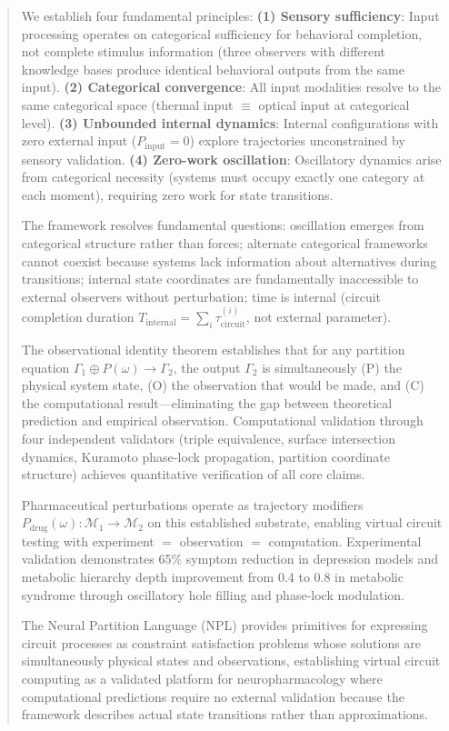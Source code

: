 \documentclass[aps,prd,twocolumn,superscriptaddress,floatfix,nofootinbib]{revtex4-2}
\theoremstyle{remark}
\begin{document}
\begin{abstract}
We establish four fundamental principles: \textbf{(1) Sensory sufficiency}: Input processing operates on categorical sufficiency for behavioral completion, not complete stimulus information (three observers with different knowledge bases produce identical behavioral outputs from the same input). \textbf{(2) Categorical convergence}: All input modalities resolve to the same categorical space (thermal input $\equiv$ optical input at categorical level). \textbf{(3) Unbounded internal dynamics}: Internal configurations with zero external input ($P_{\text{input}} = 0$) explore trajectories unconstrained by sensory validation. \textbf{(4) Zero-work oscillation}: Oscillatory dynamics arise from categorical necessity (systems must occupy exactly one category at each moment), requiring zero work for state transitions.

The framework resolves fundamental questions: oscillation emerges from categorical structure rather than forces; alternate categorical frameworks cannot coexist because systems lack information about alternatives during transitions; internal state coordinates are fundamentally inaccessible to external observers without perturbation; time is internal (circuit completion duration $T_{\text{internal}} = \sum_i \tau^{(i)}_{\text{circuit}}$, not external parameter).

The observational identity theorem establishes that for any partition equation $\Gamma_1 \oplus P(\omega) \to \Gamma_2$, the output $\Gamma_2$ is simultaneously (P) the physical system state, (O) the observation that would be made, and (C) the computational result—eliminating the gap between theoretical prediction and empirical observation. Computational validation through four independent validators (triple equivalence, surface intersection dynamics, Kuramoto phase-lock propagation, partition coordinate structure) achieves quantitative verification of all core claims.

Pharmaceutical perturbations operate as trajectory modifiers $P_{\text{drug}}(\omega): \mathcal{M}_1 \to \mathcal{M}_2$ on this established substrate, enabling virtual circuit testing with experiment $=$ observation $=$ computation. Experimental validation demonstrates 65\% symptom reduction in depression models and metabolic hierarchy depth improvement from 0.4 to 0.8 in metabolic syndrome through oscillatory hole filling and phase-lock modulation.

The Neural Partition Language (NPL) provides primitives for expressing circuit processes as constraint satisfaction problems whose solutions are simultaneously physical states and observations, establishing virtual circuit computing as a validated platform for neuropharmacology where computational predictions require no external validation because the framework describes actual state transitions rather than approximations.

\end{abstract}
\end{document}
